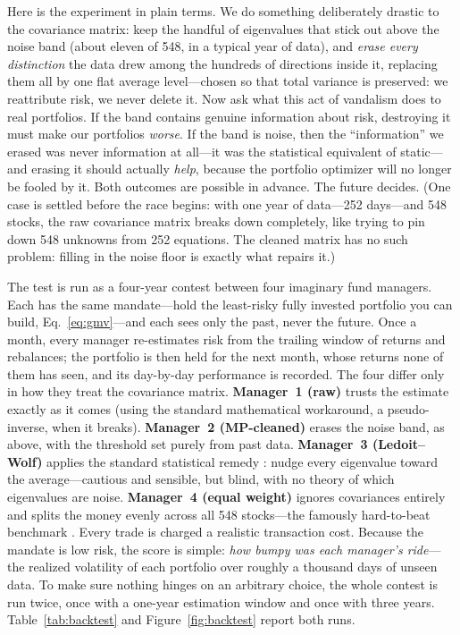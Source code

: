 \documentclass[11pt]{article}
\begin{document}
Here is the experiment in plain terms. We do something deliberately
drastic to the covariance matrix: keep the handful of eigenvalues that
stick out above the noise band (about eleven of 548, in a typical year
of data), and \emph{erase every distinction} the data drew among the
hundreds of directions inside it, replacing them all by one flat
average level---chosen so that total variance is preserved: we
reattribute risk, we never delete it. Now ask what this act of vandalism
does to real portfolios. If the band contains genuine information about
risk, destroying it must make our portfolios \emph{worse}. If the band
is noise, then the ``information'' we erased was never information at
all---it was the statistical equivalent of static---and erasing it
should actually \emph{help}, because the portfolio optimizer will no
longer be fooled by it. Both outcomes are possible in advance. The
future decides. (One case is settled before the race begins: with one
year of data---252 days---and 548 stocks, the raw covariance matrix
breaks down completely, like trying to pin down 548 unknowns from 252
equations. The cleaned matrix has no such problem: filling in the noise
floor is exactly what repairs it.)

The test is run as a four-year contest between four imaginary fund
managers. Each has the same mandate---hold the least-risky fully
invested portfolio you can build, Eq.~\eqref{eq:gmv}---and each sees
only the past, never the future. Once a month, every manager
re-estimates risk from the trailing window of returns and rebalances;
the portfolio is then held for the next month, whose returns none of
them has seen, and its day-by-day performance is recorded. The four
differ only in how they treat the covariance matrix.
\textbf{Manager~1 (raw)} trusts the estimate exactly as it comes (using
the standard mathematical workaround, a pseudo-inverse, when it breaks).
\textbf{Manager~2 (MP-cleaned)} erases the noise band, as above, with
the threshold set purely from past data.
\textbf{Manager~3 (Ledoit--Wolf)} applies the standard statistical
remedy \cite{ledoit2004}: nudge every eigenvalue toward the
average---cautious and sensible, but blind, with no theory of which
eigenvalues are noise.
\textbf{Manager~4 (equal weight)} ignores covariances entirely and
splits the money evenly across all 548 stocks---the famously
hard-to-beat benchmark \cite{demiguel2009}. Every trade is charged a
realistic transaction cost. Because the mandate is low risk, the score
is simple: \emph{how bumpy was each manager's ride}---the realized
volatility of each portfolio over roughly a thousand days of unseen
data. To make sure nothing hinges on an arbitrary choice, the whole
contest is run twice, once with a one-year estimation window and once
with three years. Table~\ref{tab:backtest} and
Figure~\ref{fig:backtest} report both runs.
\end{document}
